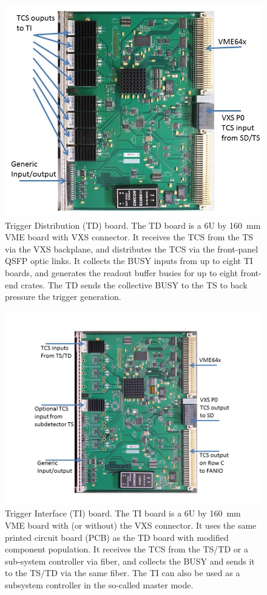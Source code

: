 \begin{figure}[hbt]
	\centering
	\includegraphics[width=1.0\columnwidth,keepaspectratio]{img/TDused.jpg}
	\caption{Trigger Distribution (TD) board.  The TD board is a 6U by 160~mm VME board with VXS connector. It
          receives the TCS from the TS via the VXS backplane, and distributes the TCS via the front-panel QSFP optic links.
          It collects the BUSY inputs from up to eight TI boards, and generates the readout buffer busies for up to eight
          front-end crates.  The TD sends the collective BUSY to the TS to back pressure the trigger generation.}
	\label{fig:TDused}
\end{figure}

\begin{figure}[hbt]
	\centering
	\includegraphics[width=1.0\columnwidth,keepaspectratio]{img/TIused.jpg}
	\caption{Trigger Interface (TI) board.  The TI board is a 6U by 160~mm VME board with (or without) the VXS
          connector.  It uses the same printed circuit board (PCB) as the TD board with modified component population. It
          receives the TCS from the TS/TD or a sub-system controller via fiber, and collects the BUSY and sends it to the
          TS/TD via the same fiber.  The TI can also be used as a subsystem controller in the so-called master mode.}
	\label{fig:TIused}
\end{figure}

